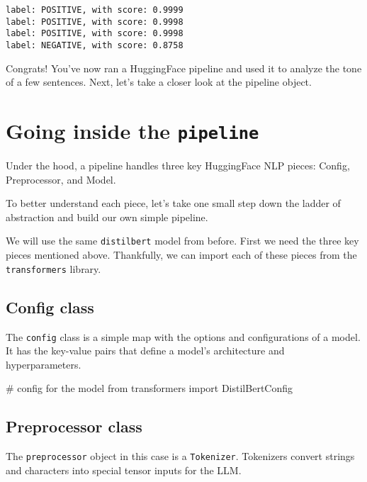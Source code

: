 \documentclass[
  letterpaper,
  DIV=11,
  numbers=noendperiod]{scrartcl}
\newenvironment{Shaded}{\begin{snugshade}}{\end{snugshade}}
\newcommand{\CommentTok}[1]{\textcolor[rgb]{0.37,0.37,0.37}{#1}}
\newcommand{\ImportTok}[1]{\textcolor[rgb]{0.00,0.46,0.62}{#1}}
\newcommand{\NormalTok}[1]{\textcolor[rgb]{0.00,0.23,0.31}{#1}}
\begin{document}
\begin{verbatim}
label: POSITIVE, with score: 0.9999
label: POSITIVE, with score: 0.9998
label: POSITIVE, with score: 0.9998
label: NEGATIVE, with score: 0.8758
\end{verbatim}

Congrats! You've now ran a HuggingFace pipeline and used it to analyze
the tone of a few sentences. Next, let's take a closer look at the
pipeline object.

\section{\texorpdfstring{Going inside the
\texttt{pipeline}}{Going inside the pipeline}}\label{going-inside-the-pipeline}

Under the hood, a pipeline handles three key HuggingFace NLP pieces:
Config, Preprocessor, and Model.

To better understand each piece, let's take one small step down the
ladder of abstraction and build our own simple pipeline.

We will use the same \texttt{distilbert} model from before. First we
need the three key pieces mentioned above. Thankfully, we can import
each of these pieces from the \texttt{transformers} library.

\subsection{Config class}\label{config-class}

The \texttt{config} class is a simple map with the options and
configurations of a model. It has the key-value pairs that define a
model's architecture and hyperparameters.

\begin{Shaded}
\begin{Highlighting}[]
\CommentTok{\# config for the model}
\ImportTok{from}\NormalTok{ transformers }\ImportTok{import}\NormalTok{ DistilBertConfig}
\end{Highlighting}
\end{Shaded}

\subsection{Preprocessor class}\label{preprocessor-class}

The \texttt{preprocessor} object in this case is a \texttt{Tokenizer}.
Tokenizers convert strings and characters into special tensor inputs for
the LLM.
\end{document}
